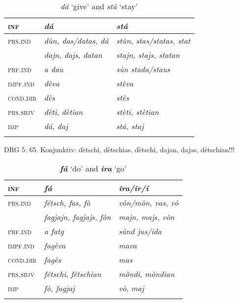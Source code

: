 \begin{table}
	\caption{\textit{dá} `give' and \textit{stá} `stay'}
	\label{}
	\begin{tabular}{lll}
		\lsptoprule
		\textsc{inf} & \textit{\textbf{dá}} & \textit{\textbf{stá}}\\
		\midrule
		
		\textsc{prs.ind} & \textit{dùn, das/datas, dá} & \textit{stùn, stas/statas, stat}\\
		& \textit{dajn, dajs, datan} & \textit{stajn, stajs, statan}\\
		\textsc{prf.ind} & \textit{a dau} & \textit{sùn stada/staus}\\
		\textsc{impf.ind} & \textit{dèva} & \textit{stèva}\\
		\textsc{cond.dir} & \textit{dès} & \textit{stès}\\
		\textsc{prs.sbjv}	& \textit{dèti}, \textit{dètian} & \textit{stèti, stètian}\\
		\textsc{imp} & \textit{dá, daj} & \textit{stá, staj}\\
		\lspbottomrule
	\end{tabular}
\end{table}

DRG 5: 65. Konjunktiv: dètschi, dètschias, dètschi, dajan, dajas, dètschian!!!


\begin{table}
	\caption{\textit{\textbf{fá}} `do' and \textit{\textbf{ira}} `go'}
	\label{}
\begin{tabular}{lll}
	\lsptoprule
	\textsc{inf} & \textit{\textbf{fá}} & \textit{\textbf{ira/ir/í}}\\
	\midrule
	\textsc{prs.ind} & \textit{fétsch, fas, fò} & \textit{vòn/mòn, vas, vò}\\
	& \textit{fagjajn, fagjajs, fòn} & \textit{majn, majs, vòn}\\
	\textsc{prf.ind} & \textit{a fatg} & \textit{sùnd jus/ida}\\
	\textsc{impf.ind} & \textit{fagèva} & \textit{mava}\\
	\textsc{cond.dir} & \textit{fagès} & \textit{mas}\\
	\textsc{prs.sbjv} & \textit{fétschi}, \textit{fétschian} & \textit{mòndi}, \textit{mòndian} \\
	\textsc{imp} & \textit{fò, fagjaj} & \textit{vò}, \textit{maj} \\
	\lspbottomrule
\end{tabular}
\end{table}


